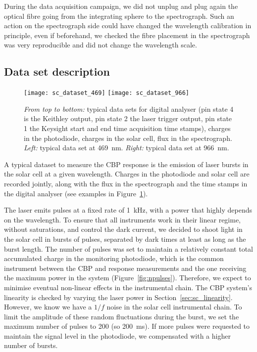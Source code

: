 During the data acquisition campaign, we did not unplug and plug again the optical fibre going from the integrating sphere to the spectrograph. Such an action on the spectrograph side could have changed the wavelength calibration in principle, even if beforehand, we checked the fibre placement in the spectrograph was very reproducible and did not change the wavelength scale.
 
\subsection{Data set description}
\label{sec:cbp_datadesc}

\begin{figure}[!h]
\centering
\texttt{[image: sc\_dataset\_469]}
\texttt{[image: sc\_dataset\_966]}
\caption{\textit{From top to bottom:} typical data sets for digital analyser (pin state 4 is the Keithley output, pin state 2 the laser trigger output, pin state 1 the Keysight start and end time acquisition time stamps), charges in the photodiode, charges in the solar cell, flux in the spectrograph. \textit{Left:} typical data set at \SI{469}{\nm}. \textit{Right:} typical data set at \SI{966}{\nm}.}\label{fig:sc_dataset_examples}
\end{figure}

A typical dataset to measure the CBP response is the emission of laser bursts in the solar cell at a given wavelength. Charges in the photodiode and solar cell are recorded jointly, along with the flux in the spectrograph and the time stamps in the digital analyser (see examples in Figure~\ref{fig:sc_dataset_examples}).

The laser emits pulses at a fixed rate of \SI{1}{\kilo\hertz}, with a power that highly depends on the wavelength. To ensure that all instruments work in their linear regime, without saturations, and control the dark current, we decided to shoot light in the solar cell in bursts of pulses, separated by dark times at least as long as the burst length. The number of pulses was set to maintain a relatively constant total accumulated charge in the monitoring photodiode, which is the common instrument between the CBP and \SD response measurements and the one receiving the maximum power in the system (Figure~\ref{fig:npulses}). Therefore, we expect to minimise eventual non-linear effects in the instrumental chain. The CBP system's linearity is checked by varying the laser power in Section~\ref{sec:sc_linearity}. However, we know we have a $1/f$ noise in the solar cell instrumental chain. To limit the amplitude of these random fluctuations during the burst, we set the maximum number of pulses to 200 (so \SI{200}{\ms}). If more pulses were requested to maintain the signal level in the photodiode, we compensated with a higher number of bursts.

